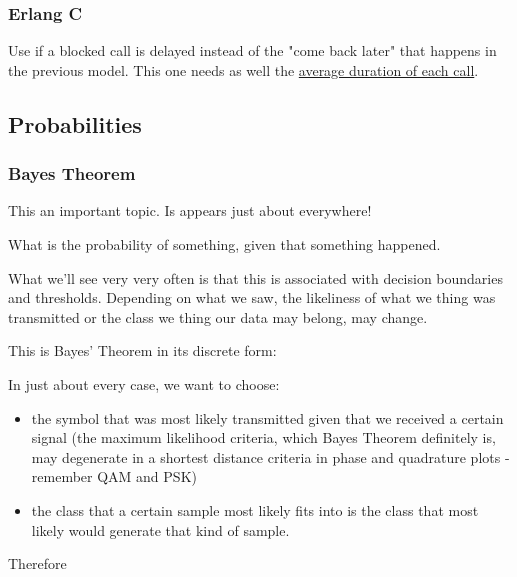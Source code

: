 \subsubsection*{Erlang C}
Use if a blocked call is delayed instead of the "come back later" that happens in the previous model. This one needs as well the \ul{average duration of each call}.




\subsection{Probabilities}

\subsubsection{Bayes Theorem}

This an important topic. Is appears just about everywhere!

What is the probability of something, given that something happened.

What we'll see very very often is that this is associated with decision 
boundaries and thresholds. Depending on what we saw, the likeliness of what we 
thing was transmitted or the class we thing our data may belong, may change.

This is Bayes' Theorem in its discrete form:




In just about every case, we want to choose:
\begin{itemize}
    \item the symbol that was most likely transmitted given that we received a certain signal (the maximum likelihood criteria, which Bayes Theorem definitely is, may degenerate in a shortest distance criteria in phase and quadrature plots - remember QAM and PSK)
    \item the class that a certain sample most likely fits into is the class that most likely would generate that kind of sample. 
\end{itemize} 

Therefore
